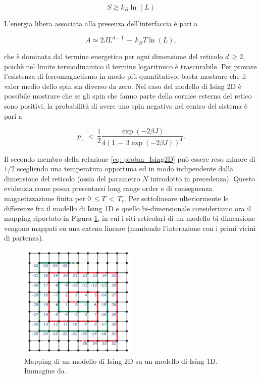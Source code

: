 \begin{equation}
    S \gtrsim k_B \ln{\left(L\right)}
    \label{eq: entr_dw_IsingdD}
\end{equation}

L'energia libera associata alla presenza dell'interfaccia è pari a 

\begin{equation}
    A \simeq 2JL^{d-1}\,-\,k_B T\ln{\left(L\right)},
    \label{eq: freeE_dw_IsingdD}
\end{equation}

che è dominata dal termine energetico per ogni dimensione del reticolo $d\,\geq 2$, poichè nel limite termodinamico il termine 
logaritmico è trascurabile. Per provare l'esistenza di ferromagnetismo in modo più quantitativo, basta mostrare che il valor medio 
dello spin sia diverso da zero. Nel caso del modello di Ising 2D è possibile mostrare che se gli spin che fanno parte della cornice 
esterna del retico sono positivi, la probabilità di avere uno spin negativo nel centro del sistema è pari a 

\begin{equation}
    p_{-}\,<\,\frac{1}{2}\frac{\exp{\left(-2\beta J\right)}}{4 \left(1\,-\,3\exp{\left(-2\beta J\right)}\right)^4}.
    \label{eq: probm_Ising2D}
\end{equation}

Il secondo membro della relazione \eqref{eq: probm_Ising2D} può essere reso minore di $1/2$ scegliendo una temperatura opportuna ed 
in modo indipendente dalla dimensione del reticolo (ossia del parametro $N$ introdotto in precedenza). Questo evidenzia come possa 
presentarsi long range order e di conseguenza magnetizzazione finita per $0\,\leq T\,<\,T_c$. Per sottolineare ulteriormente le 
differenze fra il modello di Ising 1D e quello bi-dimensionale consideriamo ora il mapping riportato in Figura \ref{fig: map_2to1_Ising}, 
in cui i siti reticolari di un modello bi-dimensione vengono mappati su una catena lineare (mantendo l'interazione con i primi 
vicini di partenza).

\begin{figure}[H]
    \centering
    \includegraphics[width=0.5\textwidth]{Immagini/map_2to1_Ising.png}
    \caption{Mapping di un modello di Ising 2D su un modello di Ising 1D. Immagine da \cite{galliFSA}.}
    \label{fig: map_2to1_Ising}
\end{figure}

